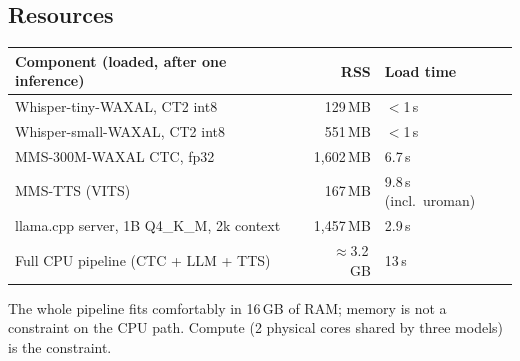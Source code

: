\subsection{Resources}
\begin{center}\small
\begin{tabular}{@{}lrl@{}}
\toprule
\textbf{Component (loaded, after one inference)} & \textbf{RSS} & \textbf{Load time} \\
\midrule
Whisper-tiny-WAXAL, CT2 int8 & 129\,MB & $<$1\,s \\
Whisper-small-WAXAL, CT2 int8 & 551\,MB & $<$1\,s \\
MMS-300M-WAXAL CTC, fp32 & 1{,}602\,MB & 6.7\,s \\
MMS-TTS (VITS) & 167\,MB & 9.8\,s (incl.\ uroman) \\
llama.cpp server, 1B Q4\_K\_M, 2k context & 1{,}457\,MB & 2.9\,s \\
\midrule
Full CPU pipeline (CTC + LLM + TTS) & $\approx$3.2\,GB & 13\,s \\
\bottomrule
\end{tabular}
\end{center}
The whole pipeline fits comfortably in 16\,GB of RAM; memory is not a constraint on the CPU path.
Compute (2 physical cores shared by three models) is the constraint.
